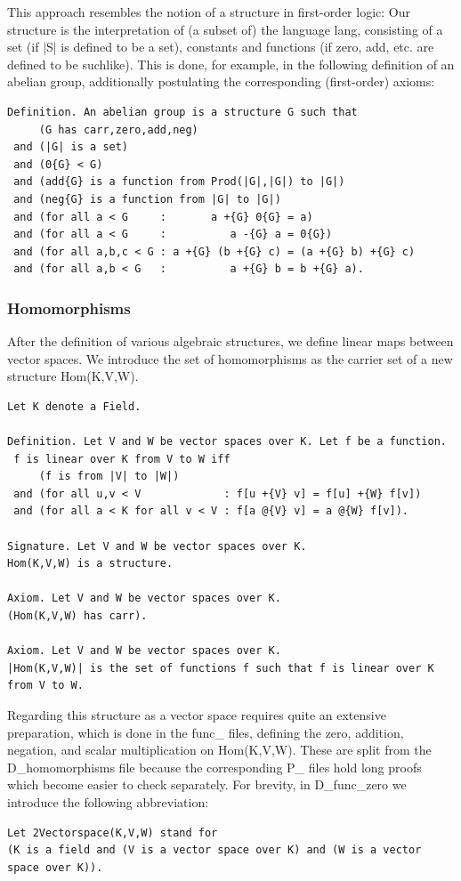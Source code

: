 \documentclass[11pt]{article}
\begin{document}
This approach resembles the notion of a structure in first-order logic: Our {\ftl structure} is the interpretation of (a subset of) the language {\ftl lang}, consisting of a set (if {\ftl |S|} is defined to be a set), constants and functions (if {\ftl zero}, {\ftl add}, etc. are defined to be suchlike).
This is done, for example, in the following definition of an abelian group, additionally postulating the corresponding (first-order) axioms:
\begin{lstlisting}
Definition. An abelian group is a structure G such that
     (G has carr,zero,add,neg)
 and (|G| is a set)
 and (0{G} < G)
 and (add{G} is a function from Prod(|G|,|G|) to |G|)
 and (neg{G} is a function from |G| to |G|)
 and (for all a < G     :       a +{G} 0{G} = a)
 and (for all a < G     :          a -{G} a = 0{G})
 and (for all a,b,c < G : a +{G} (b +{G} c) = (a +{G} b) +{G} c)
 and (for all a,b < G   :          a +{G} b = b +{G} a). 
\end{lstlisting}


\subsubsection{Homomorphisms}
After the definition of various algebraic structures, we define linear maps between vector spaces.
We introduce the set of homomorphisms as the carrier set of a new structure {\ftl Hom(K,V,W)}.
\begin{lstlisting}
Let K denote a Field.

Definition. Let V and W be vector spaces over K. Let f be a function.
 f is linear over K from V to W iff
     (f is from |V| to |W|)
 and (for all u,v < V             : f[u +{V} v] = f[u] +{W} f[v])
 and (for all a < K for all v < V : f[a @{V} v] = a @{W} f[v]).

Signature. Let V and W be vector spaces over K.
Hom(K,V,W) is a structure.

Axiom. Let V and W be vector spaces over K.
(Hom(K,V,W) has carr).

Axiom. Let V and W be vector spaces over K.
|Hom(K,V,W)| is the set of functions f such that f is linear over K from V to W.
\end{lstlisting}

Regarding this structure as a vector space requires quite an extensive preparation, which is done in the func\_ files, defining the zero, addition, negation, and scalar multiplication on {\ftl Hom(K,V,W)}. These are split from the D\_homomorphisms file because the corresponding P\_ files hold long proofs which become easier to check separately.
For brevity, in D\_func\_zero we introduce the following abbreviation:
\begin{lstlisting}
Let 2Vectorspace(K,V,W) stand for
(K is a field and (V is a vector space over K) and (W is a vector space over K)).
\end{lstlisting}
\end{document}
